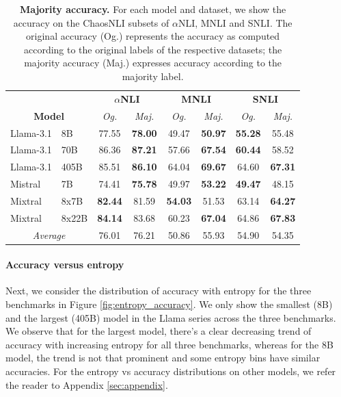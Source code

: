 \begin{table}
    \centering
    \begin{tabular}{llcccccc}
        & & \multicolumn{2}{c}{\textbf{$\alpha$NLI}} & \multicolumn{2}{c}{\textbf{MNLI}} & \multicolumn{2}{c}{\textbf{SNLI}} \\
        \multicolumn{2}{c}{\textbf{Model}} & \textit{Og.} & \textit{Maj.} & \textit{Og.} & \textit{Maj.} & \textit{Og.} & \textit{Maj.}\\
        \toprule
        Llama-3.1 & 8B & 77.55 & \textbf{78.00} & 49.47 & \textbf{50.97} & \textbf{55.28} & 55.48 \\
        Llama-3.1 & 70B & 86.36 & \textbf{87.21} & 57.66 & \textbf{67.54} & \textbf{60.44} & 58.52 \\
        Llama-3.1 & 405B & 85.51 & \textbf{86.10} & 64.04 & \textbf{69.67} & 64.60 & \textbf{67.31} \\
        \midrule
        Mistral & 7B & 74.41 & \textbf{75.78} & 49.97 & \textbf{53.22} & \textbf{49.47} & 48.15 \\
        Mixtral & 8x7B & \textbf{82.44} & 81.59 & \textbf{54.03} & 51.53 & 63.14 & \textbf{64.27} \\
        Mixtral & 8x22B & \textbf{84.14} & 83.68 & 60.23 & \textbf{67.04} & 64.86 & \textbf{67.83} \\
        \midrule
        \multicolumn{2}{c}{\emph{Average}} & 76.01 & 76.21 & 50.86 & 55.93 & 54.90 & 54.35 \\
    \bottomrule
    \end{tabular}
    \caption{\textbf{Majority accuracy.} For each model and dataset, we show the accuracy on the ChaosNLI subsets of $\alpha$NLI, MNLI and SNLI. The original accuracy (Og.) represents the accuracy as computed according to the original labels of the respective datasets; the majority accuracy (Maj.) expresses accuracy according to the majority label.}
\label{tab:chaos_acc}
\end{table}

\paragraph{Accuracy versus entropy}
Next, we consider the distribution of accuracy with entropy for the three benchmarks in Figure \ref{fig:entropy_accuracy}. We only show the smallest (8B) and the largest (405B) model in the Llama series across the three benchmarks. We observe that for the largest model, there's a clear decreasing trend of accuracy with increasing entropy for all three benchmarks, whereas for the 8B model, the trend is not that prominent and some entropy bins have similar accuracies. For the entropy vs accuracy distributions on other models, we refer the reader to Appendix \ref{sec:appendix}.

